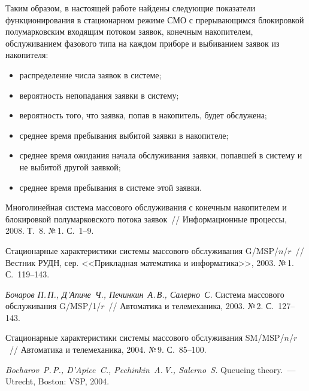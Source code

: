 \begin{multicols}{2}
Таким образом, в настоящей работе найдены следующие показатели функционирования
в стационарном режиме СМО с прерывающимся блокировкой полумарковским входящим потоком %
заявок,
конечным накопителем, обслуживанием\linebreak
 фазового типа на каждом приборе и выбиванием заявок из накопителя:
\begin{itemize}
\label{end\stat}
\item распределение числа заявок в системе;
\item
 вероятность непопадания заявки в систему;
\item
 вероятность того, что заявка, попав в накопитель, будет обслужена;
\item
 среднее время пребывания выбитой заявки в накопителе;
\item
 среднее время ожидания начала обслуживания заявки,
попавшей в систему и не выбитой другой заявкой;
\item
 среднее время пребывания в системе этой за\-явки.
\end{itemize}


{\small\frenchspacing
{%
\begin{thebibliography}{99}


Многолинейная система массового обслуживания
с конечным накопителем и блокировкой полумарковского потока заявок~//
Информационные процессы, 2008. Т.~8. №\,1.  С.~1--9.

Стационарные характеристики системы массового обслуживания G/MSP/$n$/$r$~//
Вестник РУДН, сер. <<Прикладная математика и информатика>>,
2003. №\,1. С.~119--143.

\textit{Бочаров П.\,П., Д'Апиче~Ч., Печинкин~А.\,В., Салерно~С.}
Система массового обслуживания G/MSP/1/$r$~//
Автоматика и телемеханика, 2003. №\,2. С.~127--143.

Стационарные характеристики системы массового обслуживания SM/MSP/$n$/$r$~//
Автоматика и телемеханика, 2004. №\,9. С.~85--100.


\textit{Bocharov~P.\,P., D'Apice~C., Pechinkin~A.\,V., Salerno~S.}
Queueing theory.~--- Utrecht, Boston: VSP, 2004.

\end{thebibliography}
}
}
\end{multicols}